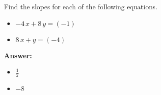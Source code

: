  Find the slopes for each of the following equations. \begin{itemize}\item \( -4 \, x + 8 \, y = \left(-1\right) \)\item \( 8 \, x + y = \left(-4\right) \)\end{itemize}

        \textbf{Answer:} \begin{itemize}\item \( \frac{1}{2} \)\item \( -8 \)\end{itemize}
